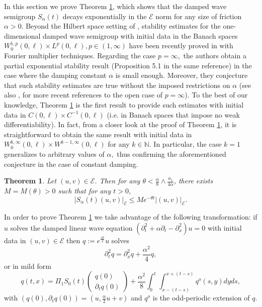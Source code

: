 \documentclass[10pt, reqno]{amsart}
\newcommand{\N}{\mathbb{N}}
\newcommand{\e}{\mathcal{E}}
\newtheorem{thm}{Theorem}
\theoremstyle{definition}
\numberwithin{lem}{section}
\numberwithin{cor}{section}
\numberwithin{prop}{section}
\numberwithin{thm}{section}
\numberwithin{dfn}{section}
\begin{document}
In this section we prove Theorem \ref{thm:Linftydecay}, which shows that the damped wave semigroup $S_\alpha(t)$ decays exponentially in the $\e$ norm for any size of friction $\alpha>0$. Beyond the Hilbert space setting of \cite{temam2012infinite}, stability estimates for the one-dimensional damped wave semigroup with initial data in the Banach spaces $W_0^{1,p}(0,\ell)\times L^p(0,\ell), p\in(1,\infty)$ have been recently proved in \cite[Theorem 4.3]{kafnemer2022lp} with Fourier multiplier techniques. Regarding the case $p=\infty,$ the authors obtain a partial exponential stability result (Proposition 5.1 in the same reference) in the case where the damping constant $\alpha$ is small enough. Moreover, they conjecture that such stability estimates are true without the imposed restrictions on $\alpha$ (see also \cite[pp.4]{chitour2024exponential}, \cite[Section 3.3]{chitour2024p} for more recent references to the open case of $p=\infty$). To the best of our knowledge, Theorem \ref{thm:Linftydecay} is the first result to provide such estimates with initial data in $C(0,\ell)\times C^{-1}(0,\ell)$ (i.e. in Banach spaces that impose no weak differentiability). In fact, from a closer look at the proof of Theorem \ref{thm:Linftydecay}, it is straightforward to obtain the same result with initial data in $W_0^{k,\infty}(0,\ell)\times W^{k-1,\infty}(0,\ell)$ for any $k\in\N.$ In particular, the case $k=1$ generalizes \cite[Proposition 5.1]{kafnemer2022lp} to arbitrary values of $\alpha,$ thus confirming the aforementioned conjecture in the case of constant damping.


\begin{thm}\label{thm:Linftydecay} 
	Let $(u,v)\in\e$. Then for any $ \theta< \tfrac{\alpha}{8}\wedge \tfrac{a_1}{4\alpha}$, there exists $M=M(\theta)>0$ such that for any $t>0$,
	\begin{equation*}
		\left|S_{\alpha}(t)(u,v) \right|_{\e} \leq M e^{-\theta t} |(u,v)|_{\e}.
	\end{equation*}
\end{thm}

In order to prove Theorem \ref{thm:Linftydecay} we take advantage of the following transformation: if $u$ solves the damped linear wave equation $(\partial_t^2+\alpha\partial_t-\partial_x^2)u=0$ with initial data in $(u,v)\in\e$ then $q := e^{\frac{\alpha t}{2}}u$  solves
\begin{equation*}
	\partial_t^2q = \partial_x^2q + \frac{\alpha^2}{4}q,
\end{equation*}
or in mild form
\begin{equation} \label{eq:q-mild}
	q(t,x)=  \Pi_1 S_0(t) \begin{pmatrix} q(0) \\ \partial_tq(0) \end{pmatrix} + \frac{\alpha^2}{8} \int_0^t \int_{x-(t-s)}^{x+(t-s)} q^o(s,y)dyds,
\end{equation}
with $(q(0), \partial_t q(0))=(u, \tfrac{\alpha}{2}u+v)$ and $q^o$ is the odd-periodic extension of $q$.
\end{document}
